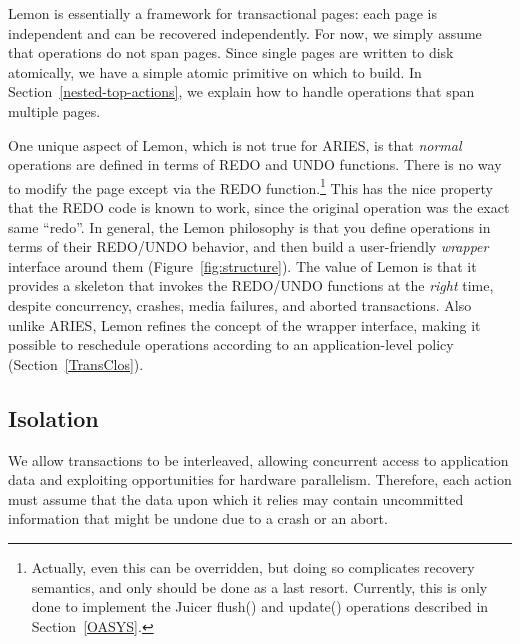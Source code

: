 \documentclass[10pt,letterpaper,twocolumn,english]{article}
\newcommand{\yad}{Lemon\xspace}
\newcommand{\oasys}{Juicer\xspace}
\begin{document}
\yad is essentially a framework for transactional pages: each page is
independent and can be recovered independently. For now, we simply
assume that operations do not span pages.  Since single pages are
written to disk atomically, we have a simple atomic primitive on which
to build. In Section~\ref{nested-top-actions}, we explain how to
handle operations that span multiple pages.

One unique aspect of \yad, which is not true for ARIES, is that {\em
normal} operations are defined in terms of REDO and UNDO
functions. There is no way to modify the page except via the REDO
function.\footnote{Actually, even this can be overridden, but doing so
complicates recovery semantics, and only should be done as a last
resort.  Currently, this is only done to implement the \oasys flush()
and update() operations described in Section~\ref{OASYS}.}  This has
the nice property that the REDO code is known to work, since the
original operation was the exact same ``redo''.  In general, the \yad
philosophy is that you define operations in terms of their REDO/UNDO
behavior, and then build a user-friendly {\em wrapper} interface
around them (Figure~\ref{fig:structure}).  The value of \yad is that it provides a skeleton that
invokes the REDO/UNDO functions at the {\em right} time, despite
concurrency, crashes, media failures, and aborted transactions.  Also
unlike ARIES, \yad refines the concept of the wrapper interface,
making it possible to reschedule operations according to an
application-level policy (Section~\ref{TransClos}).



\subsection{Isolation}
\label{Isolation}

We allow transactions to be interleaved, allowing concurrent access to
application data and exploiting opportunities for hardware
parallelism.  Therefore, each action must assume that the
data upon which it relies may contain uncommitted
information that might be undone due to a crash or an abort.

\end{document}
